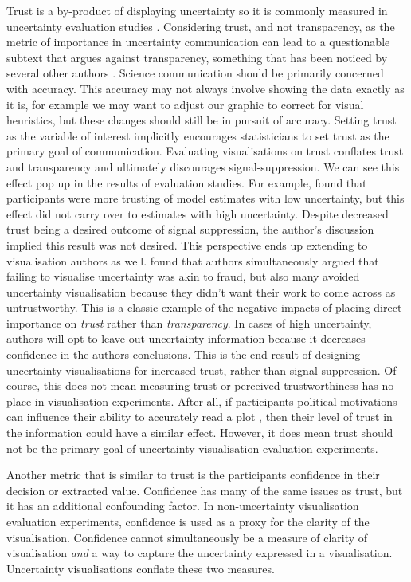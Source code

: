 \documentclass[
  12pt]{article}
\begin{document}
Trust is a by-product of displaying uncertainty so it is commonly
measured in uncertainty evaluation studies \citep{Hullman2019}.
Considering trust, and not transparency, as the metric of importance in
uncertainty communication can lead to a questionable subtext that argues
against transparency, something that has been noticed by several other
authors \citep{Spiegelhalter2017, ONeill2018}. Science communication
should be primarily concerned with accuracy. This accuracy may not
always involve showing the data exactly as it is, for example we may
want to adjust our graphic to correct for visual heuristics, but these
changes should still be in pursuit of accuracy. Setting trust as the
variable of interest implicitly encourages statisticians to set trust as
the primary goal of communication. Evaluating visualisations on trust
conflates trust and transparency and ultimately discourages
signal-suppression. We can see this effect pop up in the results of
evaluation studies. For example, \citet{Zhao2023} found that
participants were more trusting of model estimates with low uncertainty,
but this effect did not carry over to estimates with high uncertainty.
Despite decreased trust being a desired outcome of signal suppression,
the author's discussion implied this result was not desired. This
perspective ends up extending to visualisation authors as well.
\citet{Hullman2020a} found that authors simultaneously argued that
failing to visualise uncertainty was akin to fraud, but also many
avoided uncertainty visualisation because they didn't want their work to
come across as untrustworthy. This is a classic example of the negative
impacts of placing direct importance on \emph{trust} rather than
\emph{transparency}. In cases of high uncertainty, authors will opt to
leave out uncertainty information because it decreases confidence in the
authors conclusions. This is the end result of designing uncertainty
visualisations for increased trust, rather than signal-suppression. Of
course, this does not mean measuring trust or perceived trustworthiness
has no place in visualisation experiments. After all, if participants
political motivations can influence their ability to accurately read a
plot \citep{nurse2020}, then their level of trust in the information
could have a similar effect. However, it does mean trust should not be
the primary goal of uncertainty visualisation evaluation experiments.

Another metric that is similar to trust is the participants confidence
in their decision or extracted value. Confidence has many of the same
issues as trust, but it has an additional confounding factor. In
non-uncertainty visualisation evaluation experiments, confidence is used
as a proxy for the clarity of the visualisation. Confidence cannot
simultaneously be a measure of clarity of visualisation \emph{and} a way
to capture the uncertainty expressed in a visualisation. Uncertainty
visualisations conflate these two measures.
\end{document}
